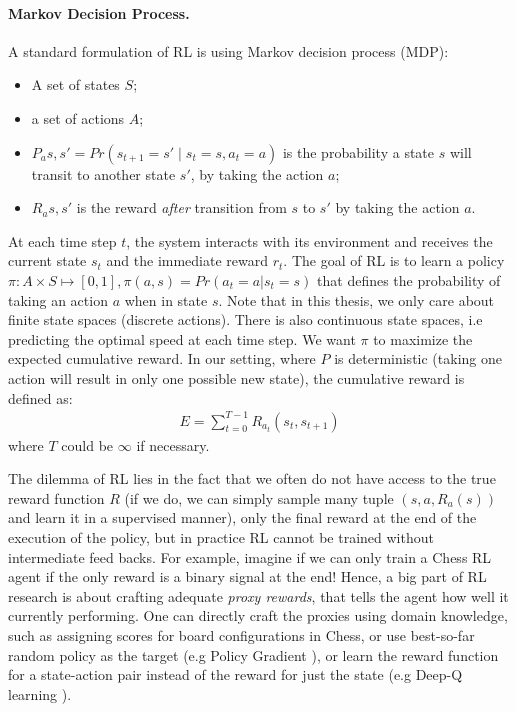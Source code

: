\paragraph{Markov Decision Process.} A standard formulation of RL is using
Markov decision process (MDP):
\begin{itemize}
  \item A set of states $S$;
  \item a set of actions $A$;
  \item $P_a{s, s'} = Pr(s_{t+1} = s' \mid s_t = s, a_t = a)$ is the probability
    a state $s$ will transit to another state $s'$, by taking the action $a$;
  \item $R_a{s, s'}$ is the reward \emph{after} transition from $s$ to $s'$ by
    taking the action $a$.  
\end{itemize}
At each time step $t$, the system interacts with its environment and receives
the current state $s_t$ and the immediate reward $r_t$. The goal of RL is to
learn a policy $\pi: A \times S \mapsto [0, 1], \pi(a, s) = Pr(a_t=a|s_t=s)$
that defines the probability of taking an action $a$ when in state $s$. Note
that in this thesis, we only care about finite state spaces (discrete actions).
There is also continuous state spaces, i.e predicting the
optimal speed at each time step. We want $\pi$ to maximize the expected
cumulative reward. In our setting, where $P$ is deterministic (taking one action
will result in only one possible new state), the cumulative
reward is defined as:
\begin{align}
  E = \sum_{t=0}^{T-1}{R_{a_t}(s_t, s_{t+1})}
\end{align}
where $T$ could be $\infty$ if necessary.

The dilemma of RL lies in the fact that we often do not have access to the true
reward function $R$ (if we do, we can simply sample many tuple $(s, a,
R_a(s))$ and learn it in a supervised manner), only the final reward at the
end of the execution of the policy, but in practice RL cannot be trained without
intermediate feed backs. For example, imagine if we can only train a Chess RL agent if the
only reward is a binary signal at the end! Hence, a big part of RL research is
about crafting adequate \emph{proxy rewards}, that tells the agent how well
it currently performing. One can directly craft the proxies using domain
knowledge, such as assigning scores for board configurations in Chess, or use
best-so-far random policy as the target (e.g Policy Gradient \cite{reinforce}), or learn the reward
function for a state-action pair instead of the reward for just the state
(e.g Deep-Q learning \cite{deepq}).